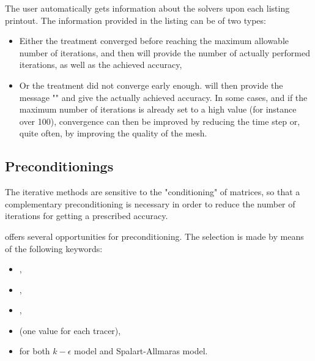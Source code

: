 The user automatically gets information about the solvers upon each listing
printout. The information provided in the listing can be of two types:

\begin{itemize}
\item Either the treatment converged before reaching the maximum allowable
number of iterations, and then  will provide the number of actually
performed iterations, as well as the achieved accuracy,

\item Or the treatment did not converge early enough.  will then
provide the message "" and give
the actually achieved accuracy. In some cases, and if the maximum number of
iterations is already set to a high value (for instance over 100), convergence
can then be improved by reducing the time step or, quite often, by improving
the quality of the mesh.
\end{itemize}


\subsection{Preconditionings}
\label{sec:precond}
The iterative methods are sensitive to the "conditioning" of matrices, so that
a complementary preconditioning is necessary in order to reduce the number of
iterations for getting a prescribed accuracy.

 offers several opportunities for preconditioning. The selection is
made by means of the following keywords:

\begin{itemize}
\item {},

\item {},

\item {},

%
\item {} (one value for each
tracer),

\item {}
for both $k-\epsilon$ model and Spalart-Allmaras model.
\end{itemize}

